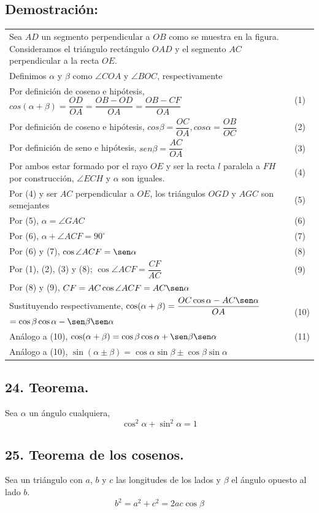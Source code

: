 \documentclass[12pt,a4paper]{article}
\begin{document}
\subsection*{Demostración:}
\begin{tabular}{p{15.9 cm} p{1cm}}
Sea $AD$ un segmento perpendicular a $OB$ como se muestra en la figura. Consideramos el triángulo rectángulo $OAD$ y el segmento $AC$ perpendicular a la recta $OE$.
\\Definimos $\alpha$ y $\beta$ como $\angle COA$ y $\angle BOC$, respectivamente
\\Por definición de coseno e hipótesis, $cos(\alpha + \beta) = \dfrac{OD}{OA}=\dfrac{OB-OD}{OA}=\dfrac{OB-CF}{OA}$ &(1)
\\Por definición de coseno e hipótesis,
$cos \beta = \dfrac{OC}{OA}, cos \alpha = \dfrac{OB}{OC}$ &(2)
\\Por definición de seno e hipótesis, $sen \beta = \dfrac{AC}{OA}$ &(3)
\\Por ambos estar formado por el rayo $OE$ y ser la recta $l$ paralela a $FH$ por construcción, $\angle ECH$ y $\alpha$ son iguales. &\medskip(4)
\\Por (4) y ser $AC$ perpendicular a $OE$, los triángulos $OGD$ y $AGC$ son semejantes &(5)
\\Por (5), $\alpha =\angle GAC$ &(6)
\\Por (6), $\alpha + \angle ACF= 90^{\circ}$  &(7)
\\Por (6) y (7), $\cos \angle ACF = \sen \alpha$&(8)
\\Por (1), (2), (3) y (8); $\cos \angle ACF = \dfrac{CF}{AC}$ &(9)
\\Por (8) y (9), $CF= AC \cos \angle ACF= AC \sen \alpha$
\\Sustituyendo respectivamente, $ \cos( \alpha + \beta)=\dfrac{OC \cos \alpha - AC \sen \alpha}{OA}$ $=\cos \beta \cos \alpha - \sen \beta \sen \alpha$ &(10)
\\Análogo a (10), $\cos (\alpha + \beta)= \cos \beta \cos \alpha + \sen \beta \sen \alpha $ &(11)
\\Análogo a (10), $\sin (\alpha \pm \beta) = \cos \alpha \sin \beta \pm \cos \beta \sin \alpha$
\end{tabular}
\subsection*{24. Teorema.}
Sea $\alpha$ un ángulo cualquiera,$$\cos^ 2 \alpha + \sin ^2 \alpha =1$$
\subsection*{25. Teorema de los cosenos.}
Sea un triángulo con $a$, $b$ y $c$ las longitudes de los lados y $\beta$ el ángulo opuesto al lado $b$.
$$b^2 = a^2 + c^2 =2ac \cos \beta$$
\end{document}
